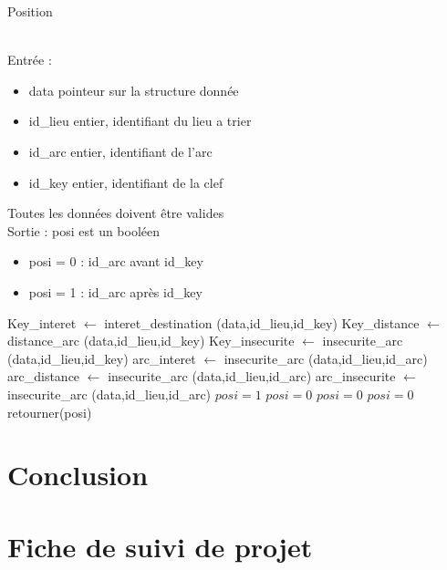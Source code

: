 \documentclass[UTF8]{EPURapport}
\begin{document}
\begin{algorithm}
\caption{Position}
\label{Position}
\begin{algorithmic}[1]
\REQUIRE  ~\\
Entrée : \begin{itemize}
\item data pointeur sur la structure donnée\\
\item id\_lieu entier, identifiant du lieu a trier\\
\item id\_arc entier, identifiant de l'arc\\
\item id\_key entier, identifiant de la clef\\
\end{itemize}
Toutes les données doivent être valides
\ENSURE ~\\
Sortie : posi est un booléen \\
\begin{itemize}
\item posi = 0 : id\_arc avant id\_key
\item posi = 1 : id\_arc après id\_key
\end{itemize}
\STATE Key\_interet $\gets$ interet\_destination (data,id\_lieu,id\_key) 
\STATE Key\_distance $\gets$ distance\_arc (data,id\_lieu,id\_key)
\STATE Key\_insecurite $\gets$ insecurite\_arc (data,id\_lieu,id\_key)
\STATE arc\_interet $\gets$ insecurite\_arc (data,id\_lieu,id\_arc)
\STATE arc\_distance $\gets$ insecurite\_arc (data,id\_lieu,id\_arc) 
\STATE arc\_insecurite $\gets$ insecurite\_arc (data,id\_lieu,id\_arc) 
\STATE $posi = 1$
 \STATE $posi=0$
\ENDIF
{}
  \STATE $posi = 0$
 \ENDIF
   \STATE $posi = 0$
  \ENDIF 
 \ENDIF
\ENDIF
\STATE retourner(posi)
  
\end{algorithmic}
\end{algorithm}


\chapter{Conclusion}

\annexes
\chapter{Fiche de suivi de projet}
\end{document}
